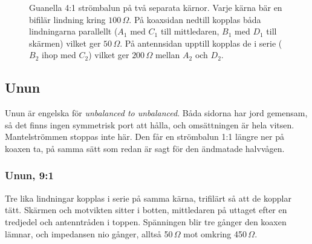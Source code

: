 \begin{figure}[H]
    \caption{Guanella 4:1 strömbalun på två separata kärnor. Varje kärna bär en
    bifilär lindning kring $100\,\Omega$. På koaxsidan nedtill kopplas båda
    lindningarna parallellt ($A_1$ med $C_1$ till mittledaren, $B_1$ med $D_1$
    till skärmen) vilket ger $50\,\Omega$. På antennsidan upptill kopplas de i
    serie ($B_2$ ihop med $C_2$) vilket ger $200\,\Omega$ mellan $A_2$ och $D_2$.}
    \label{fig:guanella-41}
    \end{figure}


\subsection{Unun}
\label{sec:unun}

Unun är engelska för \textit{unbalanced to unbalanced}. Båda sidorna har
jord gemensam, så det finns ingen symmetrisk port att hålla, och
omsättningen är hela vitsen. Mantelströmmen stoppas inte här. Den får en
strömbalun 1:1 längre ner på koaxen ta, på samma sätt som redan är sagt
för den ändmatade halvvågen.

\subsubsection{Unun, 9:1}
\label{sec:unun-91}

Tre lika lindningar kopplas i serie på samma kärna, trifilärt så att de
kopplar tätt. Skärmen och motvikten sitter i botten, mittledaren på
uttaget efter en tredjedel och antenntråden i toppen. Spänningen blir
tre gånger den koaxen lämnar, och impedansen nio gånger, alltså
50\,$\Omega$ mot omkring 450\,$\Omega$.

